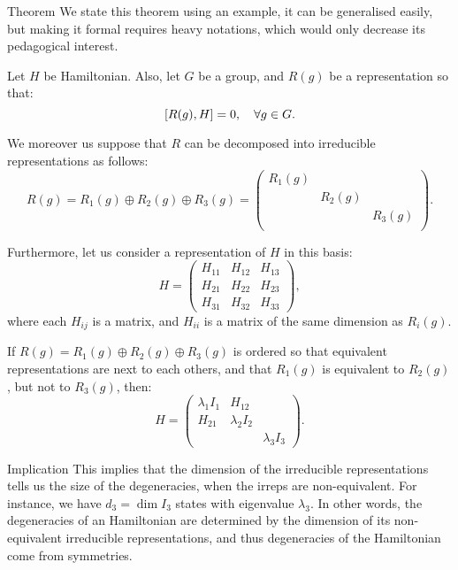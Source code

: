 \documentclass[a4paper]{article}
\begin{document}
\begin{parag}{Theorem}
    We state this theorem using an example, it can be generalised easily, but making it formal requires heavy notations, which would only decrease its pedagogical interest.

    Let $H$ be Hamiltonian. Also, let $G$ be a group, and $R\left(g\right)$ be a representation so that: 
    \[\left[R\left(g\right), H\right] = 0, \mathspace \forall g \in G.\]

    We moreover us suppose that $R$ can be decomposed into irreducible representations as follows: 
    \[R\left(g\right) = R_1\left(g\right) \oplus R_2\left(g\right) \oplus R_3\left(g\right) = \begin{pmatrix} R_1\left(g\right) &  &  \\  & R_2\left(g\right) &   \\  &  &  R_3\left(g\right)  \\  &  &  \end{pmatrix} .\]

    Furthermore, let us consider a representation of $H$ in this basis: 
    \[H = \begin{pmatrix} H_{11} & H_{12} & H_{13} \\ H_{21} & H_{22} & H_{23} \\ H_{31} & H_{32} & H_{33} \end{pmatrix}   ,\]
    where each $H_{ij}$ is a matrix, and $H_{ii}$ is a matrix of the same dimension as $R_i\left(g\right)$.

    If $R\left(g\right) = R_1\left(g\right) \oplus R_2\left(g\right) \oplus R_3\left(g\right)$ is ordered so that equivalent representations are next to each others, and that $R_1\left(g\right)$ is equivalent to $R_2\left(g\right)$, but not to $R_3\left(g\right)$, then:
    \[H = \begin{pmatrix} \lambda_1 I_1 & H_{12} &  \\ H_{21} & \lambda_2 I_2 &  \\  &  & \lambda_3 I_3 \end{pmatrix}.\]

    \begin{subparag}{Implication}
        This implies that the dimension of the irreducible representations tells us the size of the degeneracies, when the irreps are non-equivalent. For instance, we have $d_3 = \dim I_3$ states with eigenvalue $\lambda_3$. In other words, the degeneracies of an Hamiltonian are determined by the dimension of its non-equivalent irreducible representations, and thus degeneracies of the Hamiltonian come from symmetries.
    \end{subparag}


\end{parag}
\end{document}
